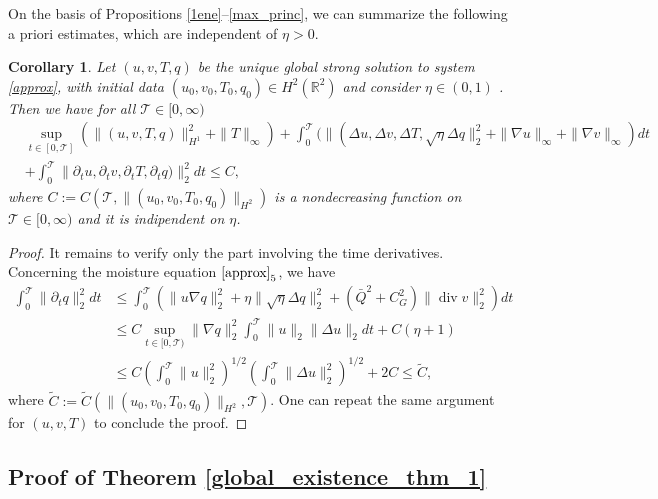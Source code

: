 \documentclass[11pt, a4paper, article,reqno,]{amsart}
\newtheorem{corollary}[theorem]{Corollary}
\theoremstyle{remark}
\DeclareMathOperator{\dive}{div}
\numberwithin{equation}{section}
\begin{document}
On the basis of Propositions \ref{1ene}–\ref{max_princ}, we can summarize the following a priori estimates, which are independent of $\eta > 0$.

\begin{corollary}\label{a_priori_estimate_eta}
    Let $(u,v,T,q)$ be the unique global strong solution to system \eqref{approx}, with initial data $(u_0,v_0,T_{0},q_0) \in H^2(\mathbb{R}^2)$ and consider $\eta \in (0, 1)$ . Then we have for all $\mathcal{T} \in [0,\infty)$
    \begin{equation*}
    \begin{aligned}
        &  \sup_{t \in [0, \mathcal{T}]}\left( \|(u,v,T, q)\|_{H^1}^2 + \|T\|_\infty \right) + \int_0^\mathcal{T} (\|(\Delta u, \Delta v, \Delta T, \sqrt{\eta}\Delta q\|_2^2 + \|\nabla u\|_{\infty} + \|\nabla v\|_{\infty})dt  \\
        & + \int_0^\mathcal{T} \|\partial_t u, \partial_t v, \partial_t T, \partial_t q)\|_2^2dt  \leq C,
    \end{aligned}
    \end{equation*}
    where $C:= C(\mathcal{T},\|(u_0,v_0,T_{0},q_0)\|_{H^2})$ is a nondecreasing function on $\mathcal{T} \in [0,\infty)$ and it is indipendent on $\eta$.
\end{corollary}
\begin{proof}
It remains to verify only the part involving the time derivatives. Concerning the moisture equation $\eqref{approx}_5$, we have 
    \begin{equation*}
    \begin{aligned}
        \int_0^\mathcal{T} \|\partial_t q\|_2^2 dt & \leq \int_0^\mathcal{T} (\|u \nabla q\|_2^2 + \eta\|\sqrt{\eta} \Delta q\|_2^2 + (\bar{Q}^2 + C_G^2)\|\dive v\|_2^2) dt \\
        &\leq C \sup_{t \in [0,\mathcal{T})} \|\nabla q\|_2^2 \int_0^\mathcal{T} \|u\|_2 \|\Delta u\|_2 dt + C(\eta + 1) \\
        & \leq C \left(\int_0^\mathcal{T} \|u\|_2^2\right)^{1/2} \left( \int_0^\mathcal{T} \|\Delta u\|_2^2 \right)^{1/2} + 2C \leq \tilde{C},
    \end{aligned}
    \end{equation*}
    where $\tilde{C}:= \tilde{C}(\|(u_0,v_0,T_{0},q_0)\|_{H^2}, \mathcal{T})$.
One can repeat the same argument for $(u,v,T)$ to conclude the proof.
\end{proof}



\subsection{Proof of Theorem \ref{global_existence_thm_1}}\label{subsec_4.1}
\end{document}
